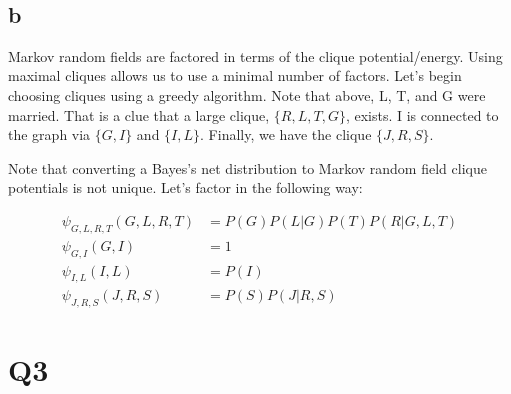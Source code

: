 \documentclass{article}
\begin{document}
~\\
~\\
~\\
~\\
~\\
~\\
~\\
~\\
~\\
~\\
~\\
~\\
~\\
~\\
~\\
~\\
~\\
~\\
~\\
~\\
~\\
~\\
~\\
~\\
~\\
~\\
~\\
~\\


\subsection{b}

Markov random fields are factored in terms of the clique potential/energy. Using 
maximal cliques allows us to use a minimal number of factors. Let's begin 
choosing cliques using a greedy algorithm. Note that above, L, T, and G were 
married. That is a clue that a large clique, $ \{R, L, T, G\} $, exists. I is 
connected to the graph via $ \{G, I\} $ and $ \{I, L\} $. Finally, we have the 
clique $\{J, R, S\}$.

Note that converting a Bayes's net distribution to Markov random 
field clique potentials is not unique. Let's factor in the 
following way:

\begin{align*}
\psi_{G, L, R, T}(G, L, R, T) &= P(G) P(L | G) P(T) P(R | G, L, T) \\
\psi_{G, I}(G, I) &= 1 \\
\psi_{I, L}(I, L) &= P(I) \\
\psi_{J, R, S}(J, R, S) &= P(S) P(J | R, S)
\end{align*}

\section{Q3}
\end{document}
